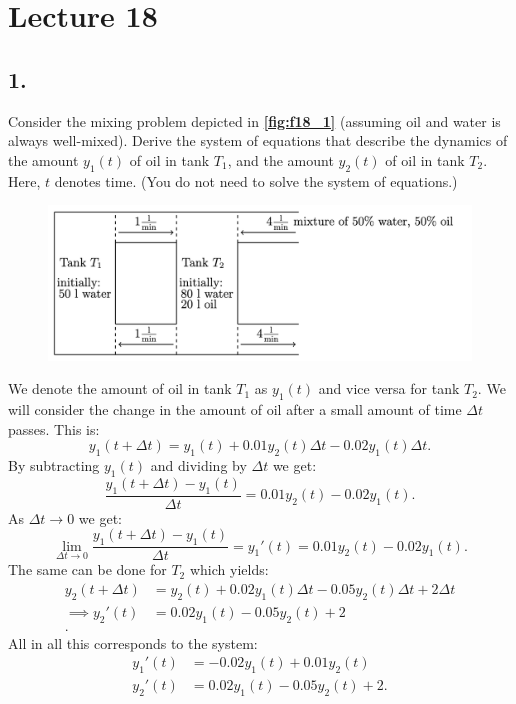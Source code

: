 \section*{Lecture 18}

\subsection*{1.} Consider the mixing problem depicted in \textbf{\autoref{fig:f18_1}} (assuming oil and water is always well-mixed). Derive the system of equations that describe the dynamics of the amount $y_1(t)$ of oil in tank $T_1$, and the amount $y_2(t)$ of oil in tank $T_2$. Here, $t$ denotes time. (You do not need to solve the system of equations.)

\begin{figure} [ht]
  \centering
  \caption{}
  \includegraphics[width=0.75\linewidth]{../figures/f18_1.png}
  \label{fig:f18_1}
\end{figure}
\bigbreak
We denote the amount of oil in tank $T_1$ as $y_1(t)$ and vice versa for tank $T_2$. We will consider the change in the amount of oil after a small amount of time $\Delta t$ passes. This is:
\[ 
y_1(t + \Delta t) = y_1(t) + \num{0,01}y_2(t)\Delta t - \num{0,02}y_1(t)\Delta t
.\]
By subtracting $y_1(t)$ and dividing by $\Delta t$ we get:
\[ 
\frac{y_1(t + \Delta t) - y_1(t)}{\Delta t} = \num{0,01}y_2(t) - \num{0,02} y_1(t)
.\]
As $\Delta t \to 0$ we get:
\[ 
\lim_{\Delta t \to 0} \frac{y_1(t + \Delta t) - y_1(t)}{\Delta t} = y_1'(t) = \num{0,01} y_2(t) - \num{0,02} y_1(t)
.\]
The same can be done for $T_2$ which yields:
\begin{align*}
  y_2(t + \Delta t) &= y_2(t) + \num{0,02}y_1(t) \Delta t - \num{0,05}y_2(t) \Delta t + 2 \Delta t \\
  \implies y_2'(t) &= \num{0,02} y_1(t) - \num{0,05} y_2(t) + 2 \\
.\end{align*}
All in all this corresponds to the system:
\begin{align*}
  y_1'(t) &= -\num{0,02}y_1(t) + \num{0,01} y_2(t) \\
  y_2'(t) &= \num{0,02} y_1(t) - \num{0,05}y_2(t) + 2
.\end{align*}

